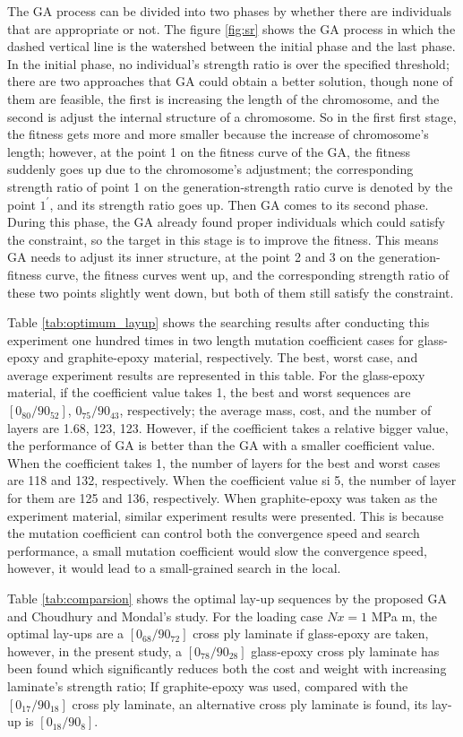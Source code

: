 The GA process can be divided into two phases by whether there are individuals
that are appropriate or not. The figure \ref{fig:sr} shows the GA process in
which the dashed vertical line is the watershed between the initial phase and
the last phase. In the initial phase, no individual's strength ratio is over
the specified threshold; there are two approaches that GA could obtain a better
solution, though none of them are feasible, the first is increasing the length
of the chromosome, and the second is adjust the internal structure of a chromosome. So
in the first first stage, the fitness gets more and more smaller because the
increase of chromosome's length; however, at the point 1 on the fitness curve
of the GA, the fitness suddenly goes up due to the chromosome's adjustment; the
corresponding strength ratio of point 1 on the generation-strength ratio curve
is denoted by the point $1^{\prime}$, and its strength ratio goes up.  Then GA
comes to its second phase. During this phase, the GA already found proper
individuals which could satisfy the constraint, so the target in this stage is
to improve the fitness. This means GA needs to adjust its inner structure, at
the point 2 and 3 on the generation-fitness curve, the fitness curves went up,
and the corresponding strength ratio of these two points slightly went down,
but both of them still satisfy the constraint.



Table \ref{tab:optimum_layup} shows the searching results after conducting this
experiment one hundred times in two length mutation coefficient cases for
glass-epoxy and graphite-epoxy material, respectively. The best, worst case, and
average experiment results are represented in this table. For the glass-epoxy
material, if the coefficient value takes 1, the best and worst sequences are
$[0_{80}/90_{52}]$, $0_{75}/90_{43}$, respectively; the average mass, cost, and
the number of layers are 1.68, 123, 123. However, if the coefficient takes a
relative bigger value, the performance of GA is better than the GA with a smaller
coefficient value. When the coefficient takes 1, the number of layers for the
best and worst cases are 118 and 132, respectively. When the coefficient value
si 5, the number of layer for them are 125 and 136, respectively. When
graphite-epoxy was taken as the experiment material, similar experiment
results were presented. This is because the mutation coefficient can control
both the convergence speed and search performance, a small mutation coefficient
would slow the convergence speed, however, it would lead to a small-grained
search in the local. 



Table \ref{tab:comparsion} shows the optimal lay-up sequences by the proposed GA
and  Choudhury and Mondal's\cite{choudhury2019failure} study. For the loading
case $Nx=1$ MPa m, the optimal lay-ups are a $[0_{68}/90_{72}]$  cross ply
laminate if glass-epoxy are taken, however,  in the present study, a
$[0_{78}/90_{28}]$ glass-epoxy cross ply laminate has been found which
significantly reduces both the cost and weight with increasing laminate's strength ratio;
If graphite-epoxy was used, compared with the $[0_{17}/90_{18}]$ cross ply
laminate, an alternative cross ply laminate is found, its lay-up is $[0_{18}/90_8]$.

